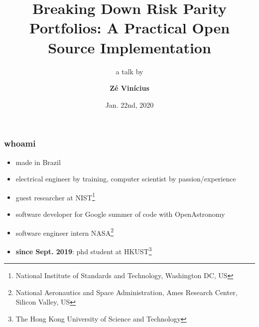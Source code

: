 \documentclass{beamer}
\title{Breaking Down Risk Parity Portfolios: A Practical Open Source Implementation}
\subtitle{a talk by}
\author{\textbf{Z\'e Vin\'icius}}
\date{Jan. 22nd, 2020}
\begin{document}
	\setcounter{showProgressBar}{0}
	\setcounter{showSlideNumbers}{0}

	\frame{\titlepage}

        \begin{frame}
          \frametitle{whoami}
              \vspace{.5cm}
          \begin{itemize}
            \item made in Brazil
              \vspace{.25cm}
            \item electrical engineer by training, computer scientist by passion/experience
              \vspace{.25cm}
            \item guest researcher at NIST\footnote{National Institute of Standards and Technology, Washington DC, US}
              \vspace{.25cm}
            \item software developer for Google summer of code with OpenAstronomy
              \vspace{.25cm}
            \item software engineer intern NASA\footnote{National Aeronautics and Space Administration,
              Ames Research Center, Silicon Valley, US}
              \vspace{.25cm}
            \item \textbf{since Sept. 2019}: phd student at HKUST\footnote{The Hong Kong University of Science
              and Technology}
          \end{itemize}
        \end{frame}



\end{document}
